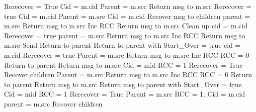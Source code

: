 \documentclass{article}
\begin{document}
\begin{algorithmic}[1]
		\State Rerecover = True
		\State Cid = m.cid
		\State Parent = m.src
	\Else
		\State Return msg to m.src
		\State Rerecover = true
		\State Cid = m.cid
		\State Parent = m.src
	\EndIf
{}
	\State Cid = m.cid
	\State Recover msg to children
	\State parent = m.src
			\State Return msg to m.src
			\State Inc RCC
			\State Return msg to m.src
				\State Clean up
			\EndIf
		\Else
			\State cid = m.cid
			\State Rerecover = true
			\State parent = m.src
		\EndIf
	\Else
			\State Return msg to m.src
			\State Inc RCC
			\State Return msg to m.src
				\State Send Return to parent
			\EndIf
		\Else
			\State Return to parent with Start\_Over = true
			\State cid = m.cid
			\State Rerecover = true
			\State Parent = m.src
		\EndIf
	\EndIf
{}
			\State Return msg to m.src
			\State Inc RCC
				\State RCC = 0
				\State Return to parent
			\EndIf
			\State Return msg to m.src
		\Else
			\State Cid = mid
			\State RCC = 1
				\State Rerecover = True	
			\Else 
				\State Recover children
			\EndIf
			\State Parent = m.src
		\EndIf
	\Else
			\State Return msg to m.src
			\State Inc RCC
				\State RCC = 0
				\State Return to parent
			\EndIf
			\State Return msg to m.src
		\Else
			\State Return msg to parent with Start\_Over = true
			\State Cid = mid
			\State RCC = 1
			\State Rerecover = True
			\State Parent = m.src
		\EndIf
	\EndIf
{}
	\State RCC = 1;
	\State Cid = m.cid
	\State parent = m.src
	\State Recover children
\EndIf
\EndProcedure
\end{algorithmic}
\end{document}
